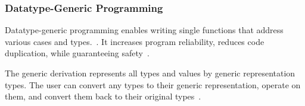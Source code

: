 \begin{frame}\frametitle{Datatype-Generic Programming}
    
  Datatype-generic programming enables writing single functions that address various cases and types.~\cite{derivable-type-classes}. 
  It increases program reliability, reduces code duplication, while guaranteeing safety~\cite{datatype-generic-programming,optimizing-generics}.
  
      
  The generic derivation represents all types and values by generic representation types. The user can convert any types to their generic representation, operate on them, and convert them back to their original types~\cite{optimizing-generics, ghc-generics}.
  
  \end{frame}


